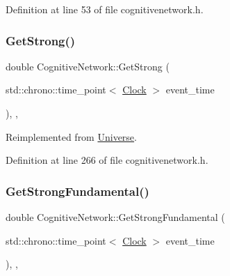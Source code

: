 Definition at line 53 of file cognitivenetwork.\+h.

\mbox{\label{class_cognitive_network_a277247686f8af159e7a7beb0ec379225}} 
\subsubsection{\texorpdfstring{Get\+Strong()}{GetStrong()}}
{\footnotesize\ttfamily double Cognitive\+Network\+::\+Get\+Strong (\begin{DoxyParamCaption}\item[{std\+::chrono\+::time\+\_\+point$<$ \hyperlink{universe_8h_a0ef8d951d1ca5ab3cfaf7ab4c7a6fd80}{Clock} $>$}]{event\+\_\+time }\end{DoxyParamCaption})\hspace{0.3cm}{\ttfamily [inline]}, {\ttfamily [final]}, {\ttfamily [virtual]}}



Reimplemented from \hyperlink{class_universe_acb453ce71da418c5b5617fecede9571b}{Universe}.



Definition at line 266 of file cognitivenetwork.\+h.

\mbox{\label{class_cognitive_network_a942ca90561fedae46136de620accbfea}} 
\subsubsection{\texorpdfstring{Get\+Strong\+Fundamental()}{GetStrongFundamental()}}
{\footnotesize\ttfamily double Cognitive\+Network\+::\+Get\+Strong\+Fundamental (\begin{DoxyParamCaption}\item[{std\+::chrono\+::time\+\_\+point$<$ \hyperlink{universe_8h_a0ef8d951d1ca5ab3cfaf7ab4c7a6fd80}{Clock} $>$}]{event\+\_\+time }\end{DoxyParamCaption})\hspace{0.3cm}{\ttfamily [inline]}, {\ttfamily [final]}, {\ttfamily [virtual]}}



